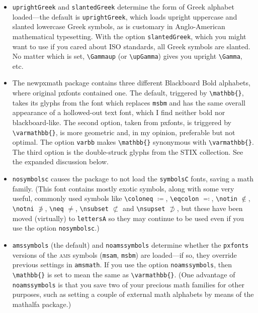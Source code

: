 \documentclass[11pt]{article}
\theoremstyle{oldplain}
\theoremstyle{plain}
\begin{document}
\begin{itemize}
\begin{verbatim}
\usepackage[cmintegrals]{newpxmath}
\end{verbatim}
you may use the forms \verb|\iint|, \verb|\iiint|, \verb|\iiiint| and \verb|\idotsint| defined in {\tt amsmath}, but using the pumped-up Computer Modern integral loaded by {\tt newpxmath}. 
\item {\tt uprightGreek} and {\tt slantedGreek} determine the form of Greek alphabet loaded---the default is {\tt uprightGreek}, which loads upright uppercase and slanted lowercase Greek symbols, as is customary in Anglo-American mathematical typesetting. With the option {\tt slantedGreek}, which you might want to use if you cared about ISO standards, all Greek symbols are slanted. No matter which is set, \verb|\Gammaup| (or \verb|\upGamma|) gives you upright \verb|\Gamma|, etc.
\item The \textsf{newpxmath} package contains three different Blackboard Bold alphabets, where original \textsf{pxfonts} contained one. The default, triggered by \verb|\mathbb{}|, takes its glyphs from the font which replaces {\tt msbm} and has the same overall appearance of a hollowed-out text font, which I find neither bold nor blackboard-like. The second option, taken from \textsf{pxfonts}, is triggered by \verb|\varmathbb{}|, is more geometric and, in my opinion, preferable but not optimal. The option {\tt varbb} makes \verb|\mathbb{}| synonymous with \verb|\varmathbb{}|. The third option is the double-struck glyphs from the STIX collection. See the expanded discussion below.
\item {\tt nosymbolsc} causes the package to not load the {\tt symbolsC} fonts, saving  a math family. (This font contains mostly exotic symbols, along with some very useful, commonly used symbols like \verb|\coloneq| $\coloneq$, \verb|\eqcolon| $\eqcolon$, \verb|\notin| $\notin$, \verb|\notni| $\notni$, \verb|\neq| $\neq$, \verb|\nsubset| $\nsubset$ and \verb|\nsupset| $\nsupset$, but these have been moved (virtually) to {\tt lettersA} so they may continue to be used even if you use the option {\tt nosymbolsc}.)
\item {\tt amssymbols} (the default) and {\tt noamssymbols} determine whether the {\tt pxfonts} versions of the \textsc{ams} symbols ({\tt msam}, {\tt msbm}) are loaded---if so, they override previous settings in {\tt amsmath}. If you use the option {\tt noamssymbols}, then \verb|\mathbb{}| is set to mean the same as \verb|\varmathbb{}|. (One advantage of {\tt noamssymbols} is that you save two of your precious math families for other purposes, such as setting a couple of external math alphabets by means of the \textsf{mathalfa} package.)
\end{itemize}
\end{document}
